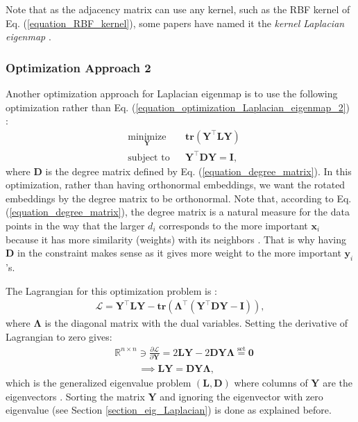 \documentclass[lang=cn,10pt]{gorgeousnbook}
\numberwithin{equation}{section}%
\numberwithin{figure}{section}%
\begin{document}
Note that as the adjacency matrix can use any kernel, such as the RBF kernel of Eq. (\ref{equation_RBF_kernel}), some papers have named it the \textit{kernel Laplacian eigenmap} \cite{guo2006kernel}. 

\subsubsection{Optimization Approach 2}\label{section_Laplacian_eigenmap_optimization_approach_2}

Another optimization approach for Laplacian eigenmap is to use the following optimization rather than Eq. (\ref{equation_optimization_Laplacian_eigenmap_2}) \cite{belkin2001laplacian}:
\begin{equation}\label{equation_optimization_Laplacian_eigenmap_3}
\begin{aligned}
& \underset{\boldsymbol{Y}}{\text{minimize}}
& & \textbf{tr}(\boldsymbol{Y}^\top \boldsymbol{L} \boldsymbol{Y}) \\
& \text{subject to}
& & 
\boldsymbol{Y}^\top \boldsymbol{D} \boldsymbol{Y} = \boldsymbol{I},
\end{aligned}
\end{equation}
where $\boldsymbol{D}$ is the degree matrix defined by Eq. (\ref{equation_degree_matrix}). In this optimization, rather than having orthonormal embeddings, we want the rotated embeddings by the degree matrix to be orthonormal. 
Note that, according to Eq. (\ref{equation_degree_matrix}), the degree matrix is a natural measure for the data points in the way that the larger $d_i$ corresponds to the more important $\boldsymbol{x}_i$ because it has more similarity (weights) with its neighbors \cite{he2004locality}. That is why having $\boldsymbol{D}$ in the constraint makes sense as it gives more weight to the more important $\boldsymbol{y}_i$'s.

The Lagrangian for this optimization problem is \cite{boyd2004convex}:
\begin{align*}
\mathcal{L} = \boldsymbol{Y}^\top \boldsymbol{L} \boldsymbol{Y} - \textbf{tr}(\boldsymbol{\Lambda}^\top (\boldsymbol{Y}^\top \boldsymbol{D} \boldsymbol{Y} - \boldsymbol{I})),
\end{align*}
where $\boldsymbol{\Lambda}$ is the diagonal matrix with the dual variables. Setting the derivative of Lagrangian to zero gives:
\begin{align}
&\mathbb{R}^{n \times n} \ni \frac{\partial \mathcal{L}}{\partial \boldsymbol{Y}} = 2 \boldsymbol{L} \boldsymbol{Y} - 2 \boldsymbol{D} \boldsymbol{Y} \boldsymbol{\Lambda} \overset{\text{set}}{=} \boldsymbol{0} \nonumber \\
&~~~~~~~~~~~ \implies \boldsymbol{L} \boldsymbol{Y} = \boldsymbol{D} \boldsymbol{Y} \boldsymbol{\Lambda}, \label{equation_Laplacian_eigenmap_generalized_eig_problem}
\end{align}
which is the generalized eigenvalue problem $(\boldsymbol{L}, \boldsymbol{D})$ where columns of $\boldsymbol{Y}$ are the eigenvectors \cite{ghojogh2019eigenvalue}. 
Sorting the matrix $\boldsymbol{Y}$ and ignoring the eigenvector with zero eigenvalue (see Section \ref{section_eig_Laplacian}) is done as explained before. 
\end{document}
